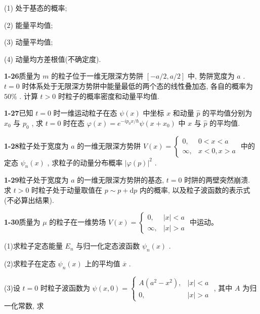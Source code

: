 (1) 处于基态的概率; 

(2) 能量平均值; 

(3) 动量平均值; 

(4) 动量均方差根值(不确定度).

\vfill

\newpage
\vfill

\noindent
\textbf{1-26}\quad 质量为 $m$ 的粒子位于一维无限深方势阱 $[-a / 2, a / 2]$ 中, 势阱宽度为 $a$ . $t = 0$ 时体系处于无限深方势阱中能量最低的两个态的线性叠加态, 各自的概率为 $50\%$ . 计算 $t > 0$ 时粒子的概率密度和动量平均值.

\vfill

\newpage
\vfill

\noindent
\textbf{1-27}\quad 已知 $t = 0$ 时一维运动粒子在态 $\psi(x)$ 中坐标 $x$ 和动量 $\hat{p}$ 的平均值分别为 $x_0$ 与 $p_0$ , 求 $t = 0$ 时在态 $\varphi(x) = e^{-ip_0x / \hbar} \psi(x + x_0)$ 中 $x$ 与 $\hat{p}$ 的平均值.

\vfill

\newpage
\vfill

\noindent
\textbf{1-28}\quad 粒子处于宽度为 $a$ 的一维无限深方势阱 $V(x) = \begin{cases} 0, & 0 < x < a \\ \infty, & x < 0, x > a \end{cases}$ 中的定态 $\psi_n(x)$ , 求粒子的动量分布概率 $\left|\varphi(p)\right|^2$ .

\vfill

\newpage
\vfill

\noindent
\textbf{1-29}\quad 粒子处于宽度为 $a$ 的一维无限深方势阱的基态, $t = 0$ 时阱的两壁突然崩溃. 求 $t > 0$ 时粒子处于动量取值在 $p \sim p + \mathrm{d}p$ 内的概率, 以及粒子波函数的表示式(不必算出结果).

\vfill

\newpage
\vfill

\noindent
\textbf{1-30}\quad 质量为 $\mu$ 的粒子在一维势场 $V(x) = \begin{cases} 0, & |x| < a \\ \infty, & |x| > a \end{cases}$ 中运动。

(1)求粒子定态能量 $E_{n}$ 与归一化定态波函数 $\psi_{n}(x)$ . 

(2)求粒子在定态 $\psi_{n}(x)$ 上的平均值 $\overline{x}$ . 

(3)设 $t = 0$ 时粒子波函数为 $\psi(x,0) = \begin{cases} A(a^2 - x^2), & |x| < a \\ 0, & |x| > a \end{cases}$ , 其中 $A$ 为归一化常数, 求 

